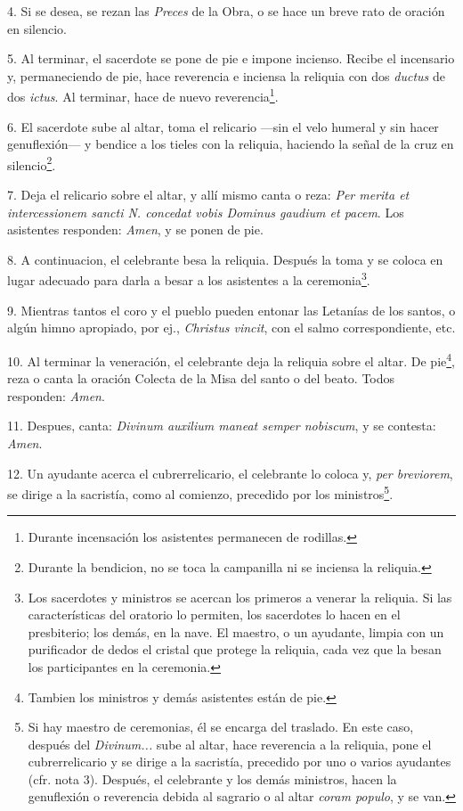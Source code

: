 4.	Si se desea, se rezan las \emph{Preces} de la Obra, o se hace un breve rato de oración en silencio.

5.	Al terminar, el sacerdote se pone de pie e impone incienso. Recibe el incensario y, permaneciendo de pie, hace reverencia e inciensa la reliquia con dos \emph{ductus} de dos \emph{ictus}. Al terminar, hace de nuevo reverencia\footnote{Durante incensación los asistentes permanecen de rodillas.}.

6. El sacerdote sube al altar, toma el relicario ---sin el velo humeral y sin hacer genuflexión--- y bendice a los tieles con la reliquia, haciendo la señal de la cruz en 
silencio\footnote{Durante la bendicion, no se toca la campanilla ni se inciensa la reliquia.}.

7. Deja el relicario sobre el altar, y allí mismo canta o reza: \emph{Per merita et intercessionem sancti  {\color {rubrica}N.} concedat vobis Dominus gaudium et pacem}. 
Los asistentes responden: \emph{Amen}, y se ponen de pie.

8. A continuacion, el celebrante besa la reliquia. Después la toma y se coloca en lugar adecuado para darla a besar a los asistentes a la ceremonia\footnote{Los sacerdotes y ministros  se acercan los primeros a venerar la reliquia. Si las características del oratorio lo permiten, los sacerdotes lo hacen en el presbiterio; los demás, en la nave. El maestro, o un ayudante, limpia con un purificador de dedos el cristal que protege la reliquia, cada vez que la besan los participantes en la ceremonia.}.

9. Mientras tantos el coro y el pueblo pueden entonar las Letanías de los santos, o algún himno apropiado, por ej., \emph{Christus vincit}, con el salmo correspondiente, etc.

10. Al terminar la veneración, el celebrante deja la reliquia sobre el altar. De pie\footnote{Tambien los ministros y demás asistentes están de pie.}, reza o canta la oración Colecta de la Misa del santo o del beato. Todos responden: \emph{Amen}.

11. Despues, canta: \emph{Divinum auxilium maneat semper nobiscum}, y se contesta: \emph{Amen}.

12. Un ayudante acerca el cubrerrelicario, el celebrante lo coloca y, \emph{per breviorem}, se dirige a la sacristía, como al comienzo, precedido por los ministros\footnote{Si hay maestro de ceremonias, él se encarga del traslado. En este caso, después del \emph{Divinum...} sube al altar, hace reverencia a la reliquia, pone el cubrerrelicario y se dirige a la sacristía, precedido por uno o varios ayudantes (cfr. nota 3). Después, el celebrante y los demás ministros, hacen la genuflexión o reverencia debida al sagrario o al altar \emph{coram populo}, y se van.}.



